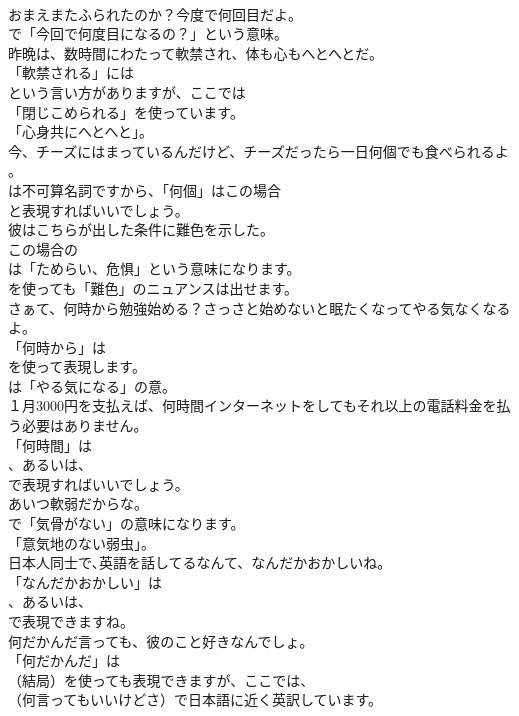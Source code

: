 \documentclass[8pt]{extreport}
\begin{document}
\begin{CJK}{UTF8}{min}
\\	おまえまたふられたのか？今度で何回目だよ。 
\\	で「今回で何度目になるの？」という意味。	
\\	昨晩は、数時間にわたって軟禁され、体も心もへとへとだ。 
\\	「軟禁される」には
\\	という言い方がありますが、ここでは
\\	「閉じこめられる」を使っています。
\\	「心身共にへとへと」。	
\\	今、チーズにはまっているんだけど、チーズだったら一日何個でも食べられるよ 。 
\\	は不可算名詞ですから、「何個」はこの場合
\\	と表現すればいいでしょう。	
\\	彼はこちらが出した条件に難色を示した。 
\\	この場合の
\\	は「ためらい、危惧」という意味になります。
\\	を使っても「難色」のニュアンスは出せます。	
\\	さぁて、何時から勉強始める？さっさと始めないと眠たくなってやる気なくなるよ。 
\\	「何時から」は
\\	を使って表現します。
\\	は「やる気になる」の意。	
\\	１月3000円を支払えば、何時間インターネットをしてもそれ以上の電話料金を払う必要はありません。 
\\	「何時間」は 
\\	、あるいは、
\\	で表現すればいいでしょう。	
\\	あいつ軟弱だからな。 
\\	で「気骨がない」の意味になります。
\\	「意気地のない弱虫」。	
\\	日本人同士で､英語を話してるなんて、なんだかおかしいね。 
\\	「なんだかおかしい」は
\\	、あるいは、
\\	で表現できますね。	
\\	何だかんだ言っても、彼のこと好きなんでしょ。 
\\	「何だかんだ」は
\\	（結局）を使っても表現できますが、ここでは、
\\	（何言ってもいいけどさ）で日本語に近く英訳しています。	

\end{CJK}
\end{document}
